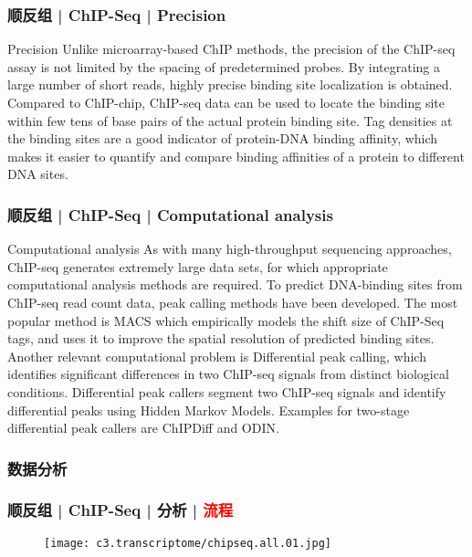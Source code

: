 \begin{frame}
  \frametitle{顺反组 | ChIP-Seq | Precision}
  \begin{block}{Precision}
    Unlike microarray-based ChIP methods, the precision of the ChIP-seq assay is not limited by the spacing of predetermined probes. By integrating a large number of short reads, highly precise binding site localization is obtained. Compared to ChIP-chip, ChIP-seq data can be used to locate the binding site within few tens of base pairs of the actual protein binding site. Tag densities at the binding sites are a good indicator of protein-DNA binding affinity, which makes it easier to quantify and compare binding affinities of a protein to different DNA sites.
  \end{block}
\end{frame}

\begin{frame}
  \frametitle{顺反组 | ChIP-Seq | Computational analysis}
  \begin{block}{Computational analysis}
    As with many high-throughput sequencing approaches, ChIP-seq generates extremely large data sets, for which appropriate computational analysis methods are required. To predict DNA-binding sites from ChIP-seq read count data, peak calling methods have been developed. The most popular method is MACS which empirically models the shift size of ChIP-Seq tags, and uses it to improve the spatial resolution of predicted binding sites.\\
    \vspace{1em}
    Another relevant computational problem is Differential peak calling, which identifies significant differences in two ChIP-seq signals from distinct biological conditions. Differential peak callers segment two ChIP-seq signals and identify differential peaks using Hidden Markov Models. Examples for two-stage differential peak callers are ChIPDiff and ODIN.
  \end{block}
\end{frame}

\subsubsection{数据分析}
\begin{frame}
  \frametitle{顺反组 | ChIP-Seq | 分析 | \textcolor{red}{流程}}
  \begin{figure}
    \centering
    \texttt{[image: c3.transcriptome/chipseq.all.01.jpg]}
  \end{figure}
\end{frame}

